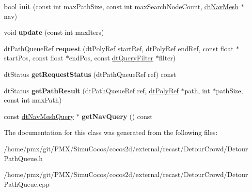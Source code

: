 \begin{DoxyCompactItemize}
bool {\bfseries init} (const int max\+Path\+Size, const int max\+Search\+Node\+Count, \hyperlink{classdtNavMesh}{dt\+Nav\+Mesh} $\ast$nav)
\item 
\mbox{\label{classdtPathQueue_ab28e659d2db86d9f5d5246811cb08da0}} 
void {\bfseries update} (const int max\+Iters)
\item 
\mbox{\label{classdtPathQueue_acc95d9bf0e1b12543be41c3ca938e994}} 
dt\+Path\+Queue\+Ref {\bfseries request} (\hyperlink{group__detour_gab4e0b2257a670c1a800057999612b466}{dt\+Poly\+Ref} start\+Ref, \hyperlink{group__detour_gab4e0b2257a670c1a800057999612b466}{dt\+Poly\+Ref} end\+Ref, const float $\ast$start\+Pos, const float $\ast$end\+Pos, const \hyperlink{classdtQueryFilter}{dt\+Query\+Filter} $\ast$filter)
\item 
\mbox{\label{classdtPathQueue_a2b1a005dfc3d8d3efd1bb4bc46f49e32}} 
dt\+Status {\bfseries get\+Request\+Status} (dt\+Path\+Queue\+Ref ref) const
\item 
\mbox{\label{classdtPathQueue_a6599518fe1e3c0e4c7d8c3cba062aeab}} 
dt\+Status {\bfseries get\+Path\+Result} (dt\+Path\+Queue\+Ref ref, \hyperlink{group__detour_gab4e0b2257a670c1a800057999612b466}{dt\+Poly\+Ref} $\ast$path, int $\ast$path\+Size, const int max\+Path)
\item 
\mbox{\label{classdtPathQueue_ad4fb7d75b1b65ad1db89782f8ad4e8da}} 
const \hyperlink{classdtNavMeshQuery}{dt\+Nav\+Mesh\+Query} $\ast$ {\bfseries get\+Nav\+Query} () const
\end{DoxyCompactItemize}


The documentation for this class was generated from the following files\+:\begin{DoxyCompactItemize}
\item 
/home/pmx/git/\+P\+M\+X/\+Simu\+Cocos/cocos2d/external/recast/\+Detour\+Crowd/Detour\+Path\+Queue.\+h\item 
/home/pmx/git/\+P\+M\+X/\+Simu\+Cocos/cocos2d/external/recast/\+Detour\+Crowd/Detour\+Path\+Queue.\+cpp\end{DoxyCompactItemize}
